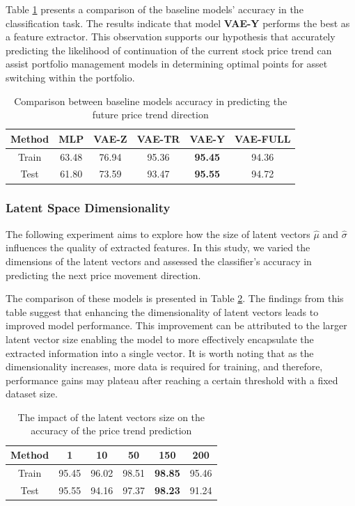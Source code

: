 Table \ref{tbl:FE-pred} presents a comparison of the baseline models' accuracy in the classification task. The results indicate that model \textbf{VAE-Y} performs the best as a feature extractor. This observation supports our hypothesis that accurately predicting the likelihood of continuation of the current stock price trend can assist portfolio management models in determining optimal points for asset switching within the portfolio.

\begin{table}[h]
	\centering
	\caption{Comparison between baseline models accuracy in predicting the future price trend direction}
	\label{tbl:FE-pred}
	\begin{tabular}{c | c | c | c | c | c }
		Method & MLP & VAE-Z & VAE-TR & VAE-Y & VAE-FULL \\
		\hline
		\hline
		Train & 63.48& 76.94 & 95.36 & \textbf{95.45} & 94.36\\
		Test & 61.80& 73.59 & 93.47 & \textbf{95.55} & 94.72\\
	\end{tabular}
\end{table}

\subsubsection{Latent Space Dimensionality}
The following experiment aims to explore how the size of latent vectors $\hat{\mu}$ and $\hat{\sigma}$ influences the quality of extracted features. In this study, we varied the dimensions of the latent vectors and assessed the classifier's accuracy in predicting the next price movement direction.

The comparison of these models is presented in Table \ref{tbl:FE-dim}. The findings from this table suggest that enhancing the dimensionality of latent vectors leads to improved model performance. This improvement can be attributed to the larger latent vector size enabling the model to more effectively encapsulate the extracted information into a single vector. It is worth noting that as the dimensionality increases, more data is required for training, and therefore, performance gains may plateau after reaching a certain threshold with a fixed dataset size.


\begin{table}[h]
	\centering
	\caption{The impact of the latent vectors size on the accuracy of the price trend prediction}
	\label{tbl:FE-dim}
	\begin{tabular}{c | c | c | c | c | c }
		Method & 1 & 10 & 50 & 150 & 200 \\
		\hline
		\hline
		Train & 95.45& 96.02 & 98.51 & \textbf{98.85} & 95.46\\
		Test & 95.55& 94.16 & 97.37 & \textbf{98.23} & 91.24\\
	\end{tabular}
\end{table}

